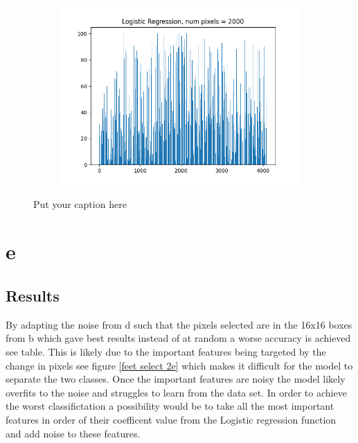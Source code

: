 \documentclass{article}
\begin{document}
\begin{figure}[H]
\begin{subfigure}{.33\textwidth}
  \label{fig:sub-second}
\end{subfigure}
\begin{subfigure}{.33\textwidth}
  \centering
  \includegraphics[width=1\linewidth]{2d/Logistic Regression, 2000.png}  
  
  \label{fig:sub-second}
\end{subfigure}
\caption{Put your caption here}
\label{feet histo 2d}
\end{figure}
\newpage
\section{e}
\subsection{Results}
By adapting the noise from d such that the pixels selected are in the 16x16 boxes from b which gave best results instead of at random a worse accuracy is achieved see table. This is likely due to the important features being targeted by the change in pixels see figure \ref{feet select 2e} which makes it difficult for the model to separate the two classes. Once the important features are noisy the model likely overfits to the noise and struggles to learn from the data set. In order to achieve the worst classifictation a possibility would be to take all the most important features in order of their coefficent value from the Logistic regression function and add noise to these features.  
\end{document}
